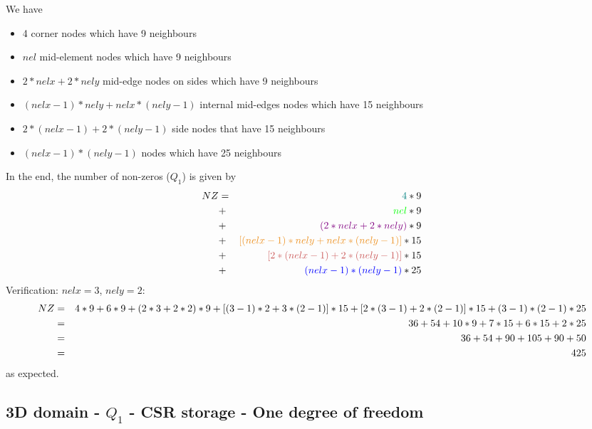 \begin{center}

\end{center}



We have
\begin{itemize}
\item {\color{teal} 4} corner nodes which have 9 neighbours
\item {\color{green} $nel$} mid-element nodes which have 9 neighbours
\item {\color{violet} $2*nelx+2*nely$} mid-edge nodes on sides which have 9 neighbours
\item {\color{carrotorange} $(nelx-1)*nely+nelx*(nely-1)$} internal mid-edges nodes which have 15 neighbours
\item {\color{chestnut} $2*(nelx-1)+2*(nely-1)$} side nodes that have 15 neighbours 
\item {\color{blue} $(nelx-1)*(nely-1)$} nodes which have 25 neighbours
\end{itemize}
In the end, the number of non-zeros ($Q_1$) is given by
\begin{eqnarray}
NZ 
&=& {\color{teal} 4 }*9 \nn\\
&+& {\color{green} nel }*9 \nn\\
&+& {\color{violet} (2*nelx+2*nely) }*9 \nn\\
&+& {\color{carrotorange} [(nelx-1)*nely+nelx*(nely-1)] }*15 \nn\\
&+& {\color{chestnut} [2*(nelx-1)+2*(nely-1)] }*15 \nn\\
&+& {\color{blue} (nelx-1)*(nely-1) }*25 \nn
\end{eqnarray}
Verification: $nelx=3$, $nely=2$:
\begin{eqnarray}
NZ
&=& 4*9 + 6*9 + (2*3+2*2)*9 + [(3-1)*2+3*(2-1)]*15
+ [2*(3-1)+2*(2-1)]*15 + (3-1)*(2-1)*25 \nonumber\\
&=& 36 + 54 + 10*9 + 7*15 + 6*15 + 2*25 \nonumber\\
&=& 36 + 54 + 90 + 105 + 90 + 50  \nonumber\\
&=& 425 \nonumber
\end{eqnarray}
as expected.








\subsection{3D domain - $Q_1$ - CSR storage - One degree of freedom}

